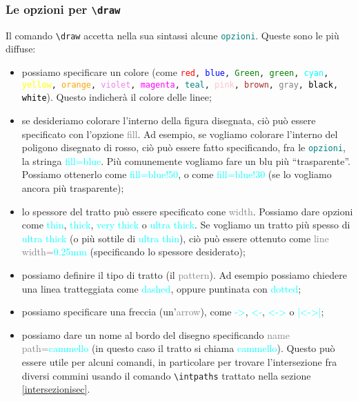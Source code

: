 \documentclass[italian, a4paper]{article}
\newcommand{\bs}{\textbackslash}
\newcommand{\ttt}[1]{\texttt{#1}}
\newcommand{\cyan}[1]{\textcolor{cyan}{#1}}
\newcommand{\gray}[1]{\textcolor{gray}{#1}}
\newcommand{\opzioni}{\textcolor{teal}{\ttt{opzioni}}}
\begin{document}
\subsubsection{Le opzioni per \ttt{\bs draw}}\label{opzsec}
Il comando \ttt{\bs draw} accetta nella sua sintassi alcune \opzioni. Queste sono le più diffuse:
\begin{itemize}
\item possiamo specificare un colore (come \ttt{\textcolor{red}{red}, \textcolor{blue}{blue}, \textcolor{Green}{Green}, \textcolor{green}{green}, \textcolor{cyan}{cyan}, \textcolor{yellow}{yellow}, \textcolor{orange}{orange}, \textcolor{violet}{violet}, \textcolor{magenta}{magenta}, \textcolor{teal}{teal}, \textcolor{pink}{pink}, \textcolor{brown}{brown}, \textcolor{gray}{gray}, \textcolor{black}{black}, \textcolor{black}{white}}). Questo indicherà il colore delle linee;
\item se desideriamo colorare l'interno della figura disegnata, ciò può essere specificato con l'opzione \gray{fill}. Ad esempio, se vogliamo colorare l'interno del poligono disegnato di rosso, ciò può essere fatto specificando, fra le \opzioni, la stringa \cyan{fill=blue}. Più comunemente vogliamo fare un blu più ``trasparente''. Possiamo ottenerlo come \cyan{fill=blue!50}, o come \cyan{fill=blue!30} (se lo vogliamo ancora più trasparente);
\item lo spessore del tratto può essere specificato cone \gray{width}. Possiamo dare opzioni come \cyan{thin}, \cyan{thick}, \cyan{very thick} o \cyan{ultra thick}. Se vogliamo un tratto più spesso di \cyan{ultra thick} (o più sottile di \cyan{ultra thin}), ciò può essere ottenuto come \gray{line width=\cyan{0.25mm}} (specificando lo spessore desiderato);
\item possiamo definire il tipo di tratto (il \gray{pattern}). Ad esempio possiamo chiedere una linea tratteggiata come \cyan{dashed}, oppure puntinata con \cyan{dotted};
\item possiamo specificare una freccia (un'\gray{arrow}), come \cyan{->}, \cyan{<-}, \cyan{<->} o \cyan{|<->|};
\item possiamo dare un nome al bordo del disegno specificando \gray{name path=\cyan{cammello}} (in questo caso il tratto si chiama \cyan{cammello}). Questo può essere utile per alcuni comandi, in particolare per trovare l'intersezione fra diversi commini usando il comando \ttt{\bs intpaths} trattato nella sezione \ref{intersezionisec}.
\end{itemize}
\end{document}
